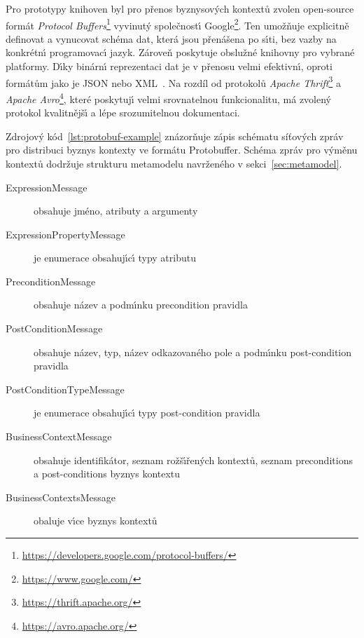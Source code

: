 Pro prototypy knihoven byl pro přenos byznysových kontextů zvolen open-source formát
\textit{Protocol Buffers}\footnote{\url{https://developers.google.com/protocol-buffers/}}\cite{varda2008protocol}
vyvinut\'y společnost\'{\i} Google\footnote{\url{https://www.google.com/}}.
Ten umožňuje explicitně definovat a vynucovat schéma dat,
která jsou přenášena po s\'{\i}ti, bez vazby na konkrétn\'{\i} programovac\'{\i}
jazyk. Zároveň poskytuje obslužné knihovny pro vybrané platformy.
D\'{\i}ky binárn\'{\i} reprezentaci dat je v přenosu velmi efektivn\'{\i},
oproti formátům jako je \gls{JSON} nebo \gls{XML}~\cite{maeda2012performance}.
Na rozdíl od protokolů \textit{Apache Thrift}\footnote{\url{https://thrift.apache.org/}}
a \textit{Apache Avro}\footnote{\url{https://avro.apache.org/}}, které poskytuj\'{\i}
velmi srovnatelnou funkcionalitu, má zvolený protokol kvalitnějš\'{\i} a lépe
srozumitelnou dokumentaci.



Zdrojov\'y kód~\ref{lst:protobuf-example} znázorňuje zápis schématu
síťových zpráv pro distribuci byznys kontexty ve formátu Protobuffer.
Schéma zpráv pro v\'yměnu kontextů dodržuje strukturu metamodelu navrženého
v sekci~\ref{sec:metamodel}.

\begin{description}
    \item [ExpressionMessage] obsahuje jméno, atributy a argumenty 
    \item [ExpressionPropertyMessage] je enumerace obsahuj\'{\i}c\'{\i} typy atributu 
    \item [PreconditionMessage] obsahuje název a podm\'{\i}nku precondition pravidla
    \item [PostConditionMessage] obsahuje název, typ, název odkazovaného pole a podm\'{\i}nku post-condition pravidla
    \item [PostConditionTypeMessage] je enumerace obsahuj\'{\i}c\'{\i} typy post-condition pravidla
    \item [BusinessContextMessage] obsahuje identifikátor, seznam rožš\'{\i}řen\'ych kontextů, seznam preconditions a post-conditions byznys kontextu
    \item [BusinessContextsMessage] obaluje v\'{\i}ce byznys kontextů
\end{description}

